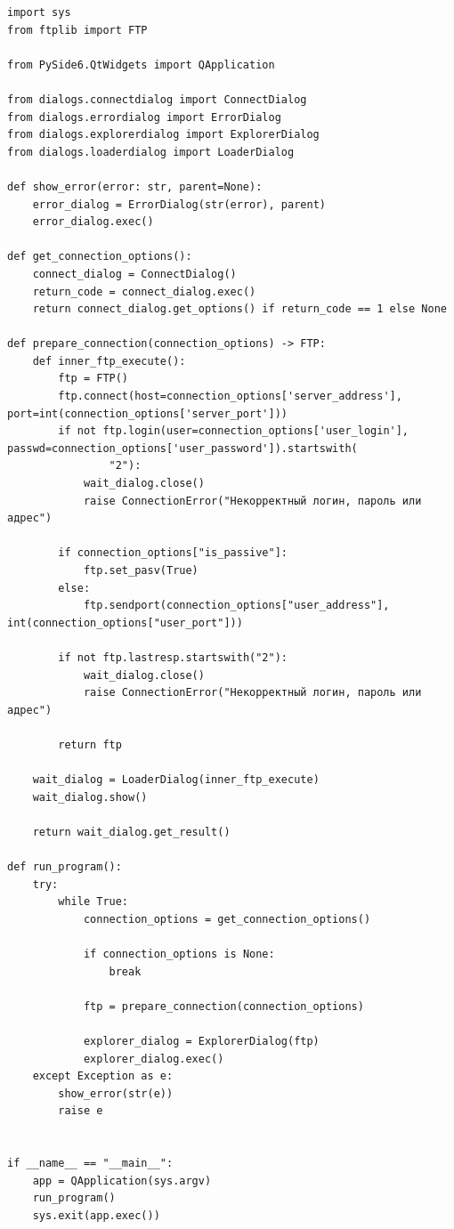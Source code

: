 \documentclass[a4paper,14pt]{extarticle}
\begin{document}
\begin{verbatim}
import sys
from ftplib import FTP

from PySide6.QtWidgets import QApplication

from dialogs.connectdialog import ConnectDialog
from dialogs.errordialog import ErrorDialog
from dialogs.explorerdialog import ExplorerDialog
from dialogs.loaderdialog import LoaderDialog

def show_error(error: str, parent=None):
    error_dialog = ErrorDialog(str(error), parent)
    error_dialog.exec()

def get_connection_options():
    connect_dialog = ConnectDialog()
    return_code = connect_dialog.exec()
    return connect_dialog.get_options() if return_code == 1 else None

def prepare_connection(connection_options) -> FTP:
    def inner_ftp_execute():
        ftp = FTP()
        ftp.connect(host=connection_options['server_address'], port=int(connection_options['server_port']))
        if not ftp.login(user=connection_options['user_login'], passwd=connection_options['user_password']).startswith(
                "2"):
            wait_dialog.close()
            raise ConnectionError("Некорректный логин, пароль или адрес")

        if connection_options["is_passive"]:
            ftp.set_pasv(True)
        else:
            ftp.sendport(connection_options["user_address"], int(connection_options["user_port"]))

        if not ftp.lastresp.startswith("2"):
            wait_dialog.close()
            raise ConnectionError("Некорректный логин, пароль или адрес")

        return ftp

    wait_dialog = LoaderDialog(inner_ftp_execute)
    wait_dialog.show()

    return wait_dialog.get_result()

def run_program():
    try:
        while True:
            connection_options = get_connection_options()

            if connection_options is None:
                break

            ftp = prepare_connection(connection_options)

            explorer_dialog = ExplorerDialog(ftp)
            explorer_dialog.exec()
    except Exception as e:
        show_error(str(e))
        raise e


if __name__ == "__main__":
    app = QApplication(sys.argv)
    run_program()
    sys.exit(app.exec())
\end{verbatim}
\end{document}
